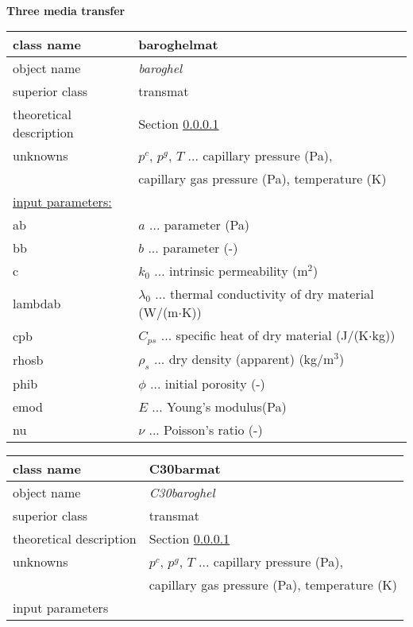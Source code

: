 \paragraph{}{\bf Three media transfer}



\begin{center}
\begin{tabular}{|l|l|}
\hline
class name & {\sf baroghelmat}\index{class!{\sf baroghelmat}}
\\ \hline
object name & {\it baroghel}\index{instance!{\it baroghelB}}
\\ \hline
superior class & {\sf transmat}
\\ \hline
theoretical description & Section \ref{}
\\ \hline
unknowns & $p^c$, $p^g$, $T$ ... capillary pressure (Pa), 
\\
 & capillary gas pressure (Pa), temperature (K)
\\ \hline
\underline{input parameters:}  & 
\\ ab & $a$ ... parameter (Pa)
\\ bb & $b$ ... parameter (-)
\\ c & $k_{0}$ ... intrinsic permeability (m$^2$)
\\ lambdab & $\lambda_0$ ... thermal conductivity of dry material (W/(m$\cdot$K))
\\ cpb & $C_{ps}$ ... specific heat of dry material (J/(K$\cdot$kg))
\\ rhosb & $\rho_s$ ... dry density (apparent) (kg/m$^3$) 
\\ phib & $\phi$ ... initial porosity (-) 
\\ emod & $E$ ... Young's modulus(Pa)
\\ nu & $\nu$ ... Poisson's ratio (-)
\\ \hline
\end{tabular}
\end{center}



\begin{center}
\begin{tabular}{|l|l|}
\hline
class name & {\sf C30barmat}\index{class!{\sf C30barmat}}
\\ \hline
object name & {\it C30baroghel}\index{instance!{\it C30baroghelB}}
\\ \hline
superior class & {\sf transmat}
\\ \hline
theoretical description & Section \ref{}
\\ \hline
unknowns & $p^c$, $p^g$, $T$ ... capillary pressure (Pa), 
\\
 & capillary gas pressure (Pa), temperature (K)
\\ \hline
input parameters & 
\\ \hline
\end{tabular}
\end{center}



